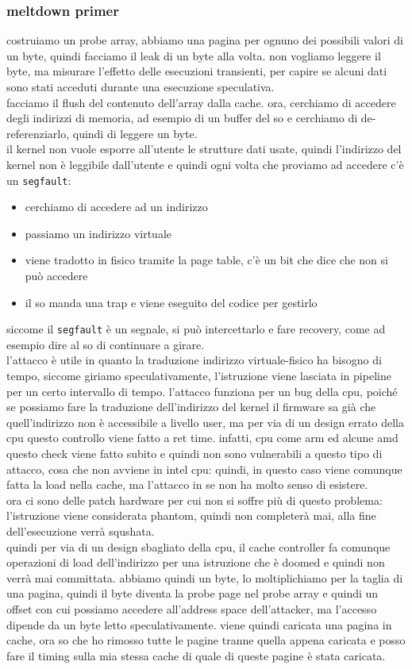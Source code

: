 \documentclass[12pt, oneside]{extbook} %
\begin{document}
\subsubsection{meltdown primer}
costruiamo un probe array, abbiamo una pagina per ognuno dei possibili valori di un byte, quindi facciamo il leak di un byte alla volta. non vogliamo leggere il byte, ma misurare l'effetto delle esecuzioni transienti, per capire se alcuni dati sono stati acceduti durante una esecuzione speculativa.\\ facciamo il flush del contenuto dell'array dalla cache. ora, cerchiamo di accedere degli indirizzi di memoria, ad esempio di un buffer del so e cerchiamo di de-referenziarlo, quindi di leggere un byte.\\ il kernel non vuole esporre all'utente le strutture dati usate, quindi l'indirizzo del kernel non è leggibile dall'utente e quindi ogni volta che proviamo ad accedere c'è un \texttt{segfault}:
\begin{itemize}
\item cerchiamo di accedere ad un indirizzo
\item passiamo un indirizzo virtuale
\item viene tradotto in fisico tramite la page table, c'è un bit che dice che non si può accedere
\item il so manda una trap e viene eseguito del codice per gestirlo
\end{itemize}
siccome il \texttt{segfault} è un segnale, si può intercettarlo e fare recovery, come ad esempio dire al so di continuare a girare.\\ l'attacco è utile in quanto la traduzione indirizzo virtuale-fisico ha bisogno di tempo, siccome giriamo speculativamente, l'istruzione viene lasciata in pipeline per un certo intervallo di tempo. l'attacco funziona per un bug della cpu, poiché se possiamo fare la traduzione dell'indirizzo del kernel il firmware sa già che quell'indirizzo non è accessibile a livello user, ma per via di un design errato della cpu questo controllo viene fatto a ret time. infatti, cpu come arm ed alcune amd questo check viene fatto subito e quindi non sono vulnerabili a questo tipo di attacco, cosa che non avviene in intel cpu: quindi, in questo caso viene comunque fatta la load nella cache, ma l'attacco in se non ha molto senso di esistere.\\ ora ci sono delle patch hardware per cui non si soffre più di questo problema: l'istruzione viene considerata phantom, quindi non completerà mai, alla fine dell'esecuzione verrà squshata.\\ quindi per via di un design sbagliato della cpu, il cache controller fa comunque operazioni di load dell'indirizzo per una istruzione che è doomed e quindi non verrà mai committata. abbiamo quindi un byte, lo moltiplichiamo per la taglia di una pagina, quindi il byte diventa la probe page nel probe array e quindi un offset con cui possiamo accedere all'address space dell'attacker, ma l'accesso dipende da un byte letto speculativamente. viene quindi caricata una pagina in cache, ora so che ho rimosso tutte le pagine tranne quella appena caricata e posso fare il timing sulla mia stessa cache di quale di queste pagine è stata caricata.
\end{document}
